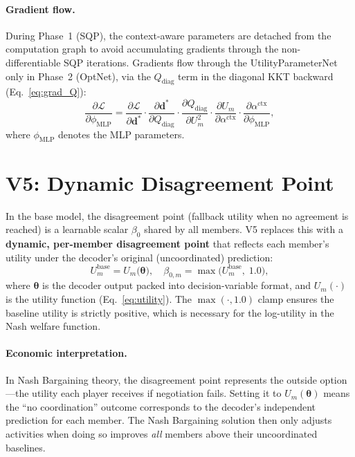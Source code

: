 \documentclass[11pt,a4paper]{article}
\newcommand{\thetapacked}{\boldsymbol{\theta}}
\begin{document}
\paragraph{Gradient flow.}
During Phase~1 (SQP), the context-aware parameters are detached from the computation graph to avoid accumulating gradients through the non-differentiable SQP iterations.
Gradients flow through the UtilityParameterNet only in Phase~2 (OptNet), via the $Q_{\mathrm{diag}}$ term in the diagonal KKT backward (Eq.~\ref{eq:grad_Q}):
\begin{equation}
    \frac{\partial \mathcal{L}}{\partial \phi_{\mathrm{MLP}}}
    = \frac{\partial \mathcal{L}}{\partial \mathbf{d}^*} \cdot \frac{\partial \mathbf{d}^*}{\partial Q_{\mathrm{diag}}} \cdot \frac{\partial Q_{\mathrm{diag}}}{\partial U_m^2} \cdot \frac{\partial U_m}{\partial \alpha^{\mathrm{ctx}}} \cdot \frac{\partial \alpha^{\mathrm{ctx}}}{\partial \phi_{\mathrm{MLP}}},
    \label{eq:ctx_grad}
\end{equation}
where $\phi_{\mathrm{MLP}}$ denotes the MLP parameters.


\section{V5: Dynamic Disagreement Point}
\label{sec:dynamic_baseline}

In the base model, the disagreement point (fallback utility when no agreement is reached) is a learnable scalar $\beta_0$ shared by all members.
V5 replaces this with a \textbf{dynamic, per-member disagreement point} that reflects each member's utility under the decoder's original (uncoordinated) prediction:
\begin{equation}
    U^{\mathrm{base}}_m = U_m\!\bigl(\thetapacked\bigr), \quad
    \beta_{0,m} = \max\!\bigl(U^{\mathrm{base}}_m,\; 1.0\bigr),
    \label{eq:dynamic_baseline}
\end{equation}
where $\thetapacked$ is the decoder output packed into decision-variable format, and $U_m(\cdot)$ is the utility function (Eq.~\ref{eq:utility}).
The $\max(\cdot, 1.0)$ clamp ensures the baseline utility is strictly positive, which is necessary for the log-utility in the Nash welfare function.

\paragraph{Economic interpretation.}
In Nash Bargaining theory, the disagreement point represents the outside option---the utility each player receives if negotiation fails.
Setting it to $U_m(\thetapacked)$ means the ``no coordination'' outcome corresponds to the decoder's independent prediction for each member.
The Nash Bargaining solution then only adjusts activities when doing so improves \emph{all} members above their uncoordinated baselines.
\end{document}
